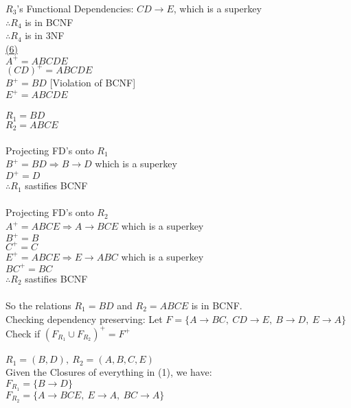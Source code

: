 \documentclass[12pt]{article}
\begin{document}
$R_3$'s Functional Dependencies: $CD\rightarrow E$, which is a superkey\\
$\therefore R_4$ is in BCNF\\
$\therefore R_4$ is in 3NF\\


\noindent \hyperlink{toc}{\hypertarget{6.6}{(6)}}\\
$A^+ = ABCDE$\\
$(CD)^+ = ABCDE$\\
$B^+ = BD$ [Violation of BCNF]\\
$E^+ = ABCDE$\\\\

$R_1 = BD$\\
$R_2 = ABCE$\\\\

Projecting FD's onto $R_1$\\
$B^+ = BD \Longrightarrow B \rightarrow D$ which is a superkey\\
$D^+ = D$\\
$\therefore R_1$ sastifies BCNF\\\\

Projecting FD's onto $R_2$\\
$A^+ = ABCE \Longrightarrow A \rightarrow BCE$ which is a superkey\\
$B^+ = B$\\
$C^+ = C$\\
$E^+ = ABCE \Longrightarrow E \rightarrow ABC$ which is a superkey\\
$BC^+ = BC$\\
$\therefore R_2$ sastifies BCNF\\\\

So the relations $R_1 = BD$ and $R_2 = ABCE$ is in BCNF.\\

Checking dependency preserving: Let $F=\{A\rightarrow BC,\ CD \rightarrow E,\ B \rightarrow D,\ E \rightarrow A\}$
Check if $(F_{R_1} \cup F_{R_2})^+ = F^+$\\\\

$R_1 = (B, D),\ R_2 = (A, B, C, E)$\\

Given the Closures of everything in (1), we have:\\
$F_{R_1} = \{B \rightarrow D\}$\\
$F_{R_2} = \{A \rightarrow BCE,\ E \rightarrow A,\ BC \rightarrow A\}$\\
\end{document}
